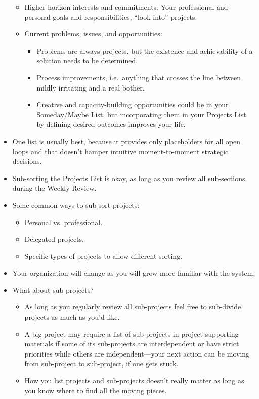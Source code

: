 \documentclass{article}
\begin{document}
\begin{itemize}
\begin{itemize}
    \item Higher-horizon interests and commitments: Your professional and personal goals and responsibilities, ``look into'' projects.
    \item Current problems, issues, and opportunities:
    \begin{itemize}
      \item Problems are always projects, but the existence and achievability of a solution needs to be determined.
      \item Process improvements, i.e.\ anything that crosses the line between mildly irritating and a real bother.
      \item Creative and capacity-building opportunities could be in your Someday/Maybe List, but incorporating them in your Projects List by defining desired outcomes improves your life.
    \end{itemize}
  \end{itemize}
  \item One list is usually best, because it provides only placeholders for all open loops and that doesn't hamper intuitive moment-to-moment strategic decisions.
  \item Sub-sorting the Projects List is okay, as long as you review all sub-sections during the Weekly Review.
  \item Some common ways to sub-sort projects:
  \begin{itemize}
    \item Personal vs. professional.
    \item Delegated projects.
    \item Specific types of projects to allow different sorting.
  \end{itemize}
  \item Your organization will change as you will grow more familiar with the system.
  \item What about sub-projects?
  \begin{itemize}
    \item As long as you regularly review all sub-projects feel free to sub-divide projects as much as you'd like.
    \item A big project may require a list of sub-projects in project supporting materials if some of its sub-projects are interdependent or have strict priorities while others are independent---your next action can be moving from sub-project to sub-project, if one gets stuck.
    \item How you list projects and sub-projects doesn't really matter as long as you know where to find all the moving pieces.
  \end{itemize}
\end{itemize}
\end{document}
